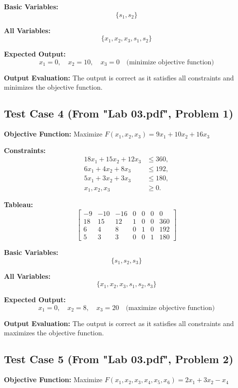 \documentclass[12pt, legalpaper]{exam}
\begin{document}
\textbf{Basic Variables:}
\[
\{ s_1, s_2 \}
\]

\textbf{All Variables:}
\[
\{ x_1, x_2, x_3, s_1, s_2 \}
\]

\textbf{Expected Output:}
\[
x_1 = 0, \quad x_2 = 10, \quad x_3 = 0 \quad \text{(minimize objective function)}
\]

\textbf{Output Evaluation:} The output is correct as it satisfies all constraints and minimizes the objective function.

\subsection*{Test Case 4 (From "Lab 03.pdf", Problem 1)}

\textbf{Objective Function:} Maximize \( F(x_1, x_2, x_3) = 9x_1 + 10x_2 + 16x_3 \)

\textbf{Constraints:}
\[
\begin{aligned}
18x_1 + 15x_2 + 12x_3 &\leq 360, \\
6x_1 + 4x_2 + 8x_3 &\leq 192, \\
5x_1 + 3x_2 + 3x_3 &\leq 180, \\
x_1, x_2, x_3 &\geq 0.
\end{aligned}
\]

\textbf{Tableau:}
\[
\begin{bmatrix}
-9 & -10 & -16 & 0 & 0 & 0 & 0 \\
18 & 15 & 12 & 1 & 0 & 0 & 360 \\
6 & 4 & 8 & 0 & 1 & 0 & 192 \\
5 & 3 & 3 & 0 & 0 & 1 & 180
\end{bmatrix}
\]

\textbf{Basic Variables:}
\[
\{ s_1, s_2, s_3 \}
\]

\textbf{All Variables:}
\[
\{ x_1, x_2, x_3, s_1, s_2, s_3 \}
\]

\textbf{Expected Output:}
\[
x_1 = 0, \quad x_2 = 8, \quad x_3 = 20 \quad \text{(maximize objective function)}
\]

\textbf{Output Evaluation:} The output is correct as it satisfies all constraints and maximizes the objective function.

\subsection*{Test Case 5 (From "Lab 03.pdf", Problem 2)}

\textbf{Objective Function:} Maximize \( F(x_1, x_2, x_3, x_4, x_5, x_6) = 2x_1 + 3x_2 - x_4 \)
\end{document}
